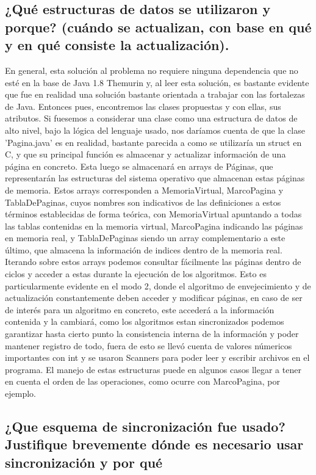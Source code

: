 \documentclass[a4paper]{article}
\begin{document}
\subsection{¿Qué estructuras de datos se utilizaron y porque? (cuándo se actualizan, con base en qué y en qué consiste la actualización). }
En general, esta solución al problema no requiere ninguna dependencia que
no esté en la base de Java 1.8 Themurin y, al leer esta solución, es
bastante evidente que fue en realidad una solución bastante orientada a
trabajar con las fortalezas de Java. Entonces pues, encontremos las clases
propuestas y con ellas, sus atributos. Si fuesemos a considerar una clase
como una estructura de datos de alto nivel, bajo la lógica del lenguaje usado,
nos daríamos cuenta de que la clase 'Pagina.java' es en realidad, bastante
parecida a como se utilizaría un struct en C, y que su principal función es
almacenar y actualizar información de una página en concreto. Esta luego se
almacenará en arrays de Páginas, que representarán las estructuras del sistema
operativo que almacenan estas páginas de memoria. Estos arrays corresponden a
MemoriaVirtual, MarcoPagina y TablaDePaginas, cuyos nombres son indicativos de
las definiciones a estos términos establecidas de forma teórica, con MemoriaVirtual
apuntando a todas las tablas contenidas en la memoria virtual, MarcoPagina indicando
las páginas en memoria real, y TablaDePaginas siendo un array complementario a
este último, que almacena la información de indices dentro de la memoria real. 
Iterando sobre estos arrays podemos consultar fácilmente las páginas dentro de ciclos y acceder a estas
durante la ejecución de los algoritmos. Esto es particularmente evidente en
el modo 2, donde el algoritmo de envejecimiento y de actualización constantemente
deben acceder y modificar páginas, en caso de ser de interés para un algoritmo
en concreto, este accederá a la información contenida y la cambiará, como los
algoritmos estan sincronizados podemos garantizar hasta cierto punto la 
consistencia interna de la información y poder mantener registro de todo,
fuera de esto se llevó cuenta de valores númericos importantes con int y se
usaron Scanners para poder leer y escribir archivos en el programa. El manejo de
estas estructuras puede en algunos casos llegar a tener en cuenta el orden de las
operaciones, como ocurre con MarcoPagina, por ejemplo.

\subsection{¿Que esquema de sincronización fue usado? Justifique brevemente dónde es necesario usar sincronización y por qué}
\end{document}
